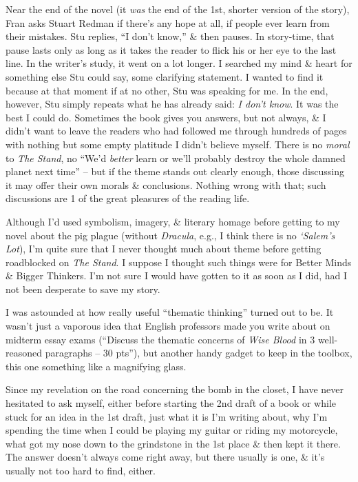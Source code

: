 \documentclass{article}
\numberwithin{equation}{section}
\begin{document}
Near the end of the novel (it \textit{was} the end of the 1st, shorter version of the story), Fran asks Stuart Redman if there's any hope at all, if people ever learn from their mistakes. Stu replies, ``I don't know,'' \& then pauses. In story-time, that pause lasts only as long as it takes the reader to flick his or her eye to the last line. In the writer's study, it went on a lot longer. I searched my mind \& heart for something else Stu could say, some clarifying statement. I wanted to find it because at that moment if at no other, Stu was speaking for me. In the end, however, Stu simply repeats what he has already said: \textit{I don't know}. It was the best I could do. Sometimes the book gives you answers, but not always, \& I didn't want to leave the readers who had followed me through hundreds of pages with nothing but some empty platitude I didn't believe myself. There is no \textit{moral} to \textit{The Stand}, no ``We'd \textit{better} learn or we'll probably destroy the whole damned planet next time'' -- but if the theme stands out clearly enough, those discussing it may offer their own morals \& conclusions. Nothing wrong with that; such discussions are 1 of the great pleasures of the reading life.

Although I'd used symbolism, imagery, \& literary homage before getting to my novel about the pig plague (without \textit{Dracula}, e.g., I think there is no \textit{`Salem's Lot}), I'm quite sure that I never thought much about theme before getting roadblocked on \textit{The Stand}. I suppose I thought such things were for Better Minds \& Bigger Thinkers. I'm not sure I would have gotten to it as soon as I did, had I not been desperate to save my story.

I was astounded at how really useful ``thematic thinking'' turned out to be. It wasn't just a vaporous idea that English professors made you write about on midterm essay exams (``Discuss the thematic concerns of \textit{Wise Blood} in 3 well-reasoned paragraphs -- 30 pts''), but another handy gadget to keep in the toolbox, this one something like a magnifying glass.

Since my revelation on the road concerning the bomb in the closet, I have never hesitated to ask myself, either before starting the 2nd draft of a book or while stuck for an idea in the 1st draft, just what it is I'm writing about, why I'm spending the time when I could be playing my guitar or riding my motorcycle, what got my nose down to the grindstone in the 1st place \& then kept it there. The answer doesn't always come right away, but there usually is one, \& it's usually not too hard to find, either.
\end{document}
